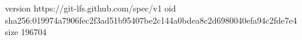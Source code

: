 version https://git-lfs.github.com/spec/v1
oid sha256:019974a7906fec2f3ad51b95407be2c144a0bdea8c2d6980040efa94c2fde7e4
size 196704
